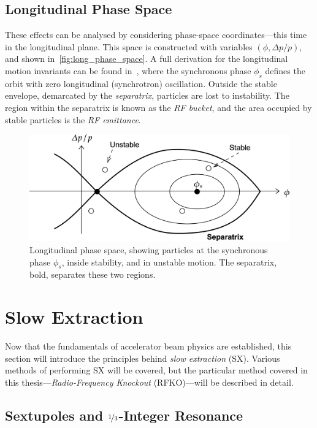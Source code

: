 \documentclass[a4paper,twoside,11pt]{report}
\begin{document}
\subsection{Longitudinal Phase Space}\label{sec:long_phase_space}

These effects can be analysed by considering phase-space coordinates---this time in the longitudinal plane. This space is constructed with variables $(\phi , \Delta p/p)$, and shown in~\autoref{fig:long_phase_space}. A full derivation for the longitudinal motion invariants can be found in~\cite{lbd:tecker}, where the synchronous phase $\phi_s$ defines the orbit with zero longitudinal (synchrotron) oscillation. Outside the stable envelope, demarcated by the \textit{separatrix}, particles are lost to instability. The region within the separatrix is known as the \textit{RF bucket}, and the area occupied by stable particles is the \textit{RF emittance}.

\begin{figure}[h]
  \centering
  \includegraphics*[width=0.9\linewidth]{long-phase-space.png}
  \caption[Longitudinal phase space and particle stability]{Longitudinal phase space, showing particles at the synchronous phase $\phi_s$, inside stability, and in unstable motion. The separatrix, bold, separates these two regions.}\label{fig:long_phase_space}
\end{figure}

\section{Slow Extraction}\label{sx}
Now that the fundamentals of accelerator beam physics are established, this section will introduce the principles behind \textit{slow extraction} (SX). Various methods of performing SX will be covered, but the particular method covered in this thesis---\textit{Radio-Frequency Knockout} (RFKO)---will be described in detail.

\subsection{Sextupoles and $\nicefrac 13$-Integer Resonance}
\end{document}
